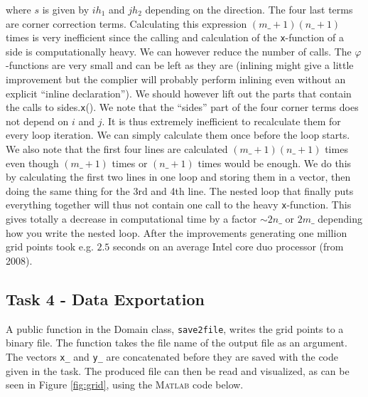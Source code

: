 \documentclass[paper=a4, fontsize=12pt]{article} %
\begin{document}
where $s$ is given by $ih_1$ and $jh_2$ depending on the direction. The four last terms are corner correction terms. Calculating this expression $(m\_+1)(n\_+1)$ times is very inefficient since the calling and calculation of the \texttt{x}-function of a side is computationally heavy. We can however reduce the number of calls. The $\varphi$-functions are very small and can be left as they are (inlining might give a little improvement but the complier will probably perform inlining even without an explicit ``inline declaration''). We should however lift out the parts that contain the calls to sides.\texttt{x}(). We note that the ``sides'' part of the four corner terms does not depend on $i$ and $j$. It is thus extremely inefficient to recalculate them for every loop iteration. We can simply calculate them once before the loop starts. We also note that the first four lines are calculated $(m\_+1)(n\_+1)$ times even though $(m\_+1)$ times or $(n\_+1)$ times would be enough. We do this by calculating the first two lines in one loop and storing them in a vector, then doing the same thing for the 3rd and 4th line. The nested loop that finally puts everything together will thus not contain one call to the heavy \texttt{x}-function. This gives totally a decrease in computational time by a factor $\sim 2n\_ $ or $2m\_ $ depending how you write the nested loop. After the improvements generating one million grid points took e.g. $2.5$ seconds on an average Intel core duo processor (from 2008).  \\

\subsection*{Task 4 - Data Exportation}

A public function in the Domain class, \texttt{save2file}, writes the grid points to a binary file. The function takes the file name of the output file as an argument. The vectors \texttt{x\_} and \texttt{y\_} are concatenated before they are saved with the code given in the task. The produced file can then be read and visualized, as can be seen in Figure \ref{fig:grid}, using the \textsc{Matlab} code below.
\end{document}
